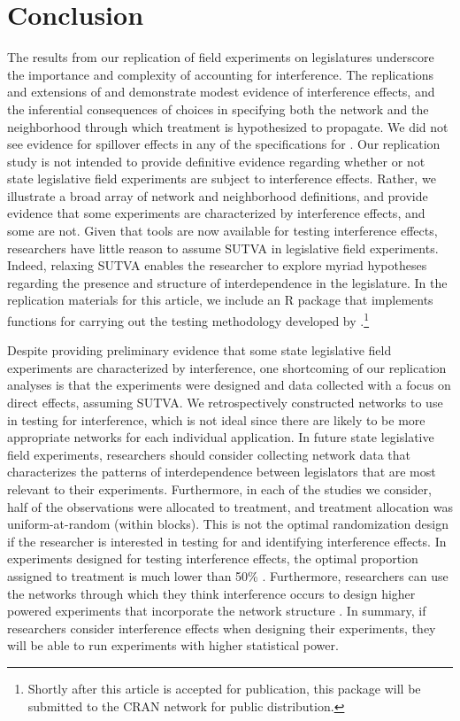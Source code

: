 \documentclass[12pt]{article}
\begin{document}
\section{Conclusion}


The results from our replication of field experiments on legislatures underscore the importance and complexity of accounting for interference. The replications and extensions of \citet{coppock2014information} and \citet{broockman2013black} demonstrate modest evidence of interference effects, and the inferential consequences of choices in specifying both the network and the neighborhood through which treatment is hypothesized to propagate. We did not see evidence for spillover effects in any of the specifications for \citet{bergan2015call}.  Our replication study is not intended to provide definitive evidence regarding whether or not state legislative field experiments are subject to interference effects. Rather, we illustrate a broad array of network and neighborhood definitions, and provide evidence that some experiments are characterized by interference effects, and some are not. Given that tools are now available for testing interference effects, researchers have little reason to assume SUTVA in legislative field experiments. Indeed, relaxing SUTVA enables the researcher to explore myriad hypotheses regarding the presence and structure of interdependence in the legislature. In the replication materials for this article, we include an R package that implements functions for carrying out the testing methodology developed by \citet{bowers2012reasoning}.\footnote{Shortly after this article is accepted for publication, this package will be submitted to the CRAN network for public distribution.}

Despite providing preliminary evidence that some state legislative field experiments are characterized by interference, one shortcoming of our replication analyses is that the experiments were designed and data collected with a focus on direct effects, assuming SUTVA. We retrospectively constructed networks to use in testing for interference, which is not ideal since there are likely to be more appropriate networks for each individual application. In future state legislative field experiments, researchers should consider collecting network data that characterizes the patterns of interdependence between legislators that are most relevant to their experiments. Furthermore, in each of the studies we consider, half of the observations were allocated to treatment, and treatment allocation was uniform-at-random (within blocks). This is not the optimal randomization design if the researcher is interested in testing for and identifying interference effects. In experiments designed for testing interference effects, the optimal proportion assigned to treatment is much lower than 50\% \citep{bowers2016models}. Furthermore,  researchers can use the networks through which they think interference occurs to design higher powered experiments that incorporate the network structure \citep{bowers2016models}. In summary, if researchers consider interference effects when designing their experiments, they will be able to run experiments with higher statistical power.




\end{document}
